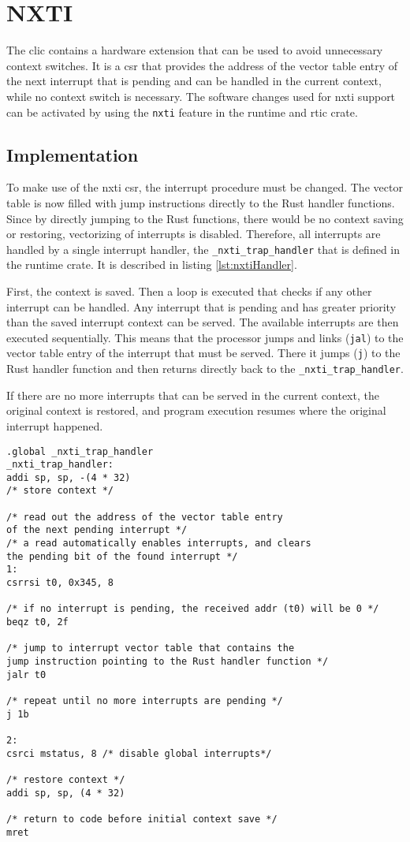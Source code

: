 \section{NXTI}
\label{sec:nxti}
The \gls{clic} contains a hardware extension that can be used to avoid unnecessary context switches. It is a \gls{csr} that provides the address of the vector table entry of the next interrupt that is pending and can be handled in the current context, while no context switch is necessary. The software changes used for nxti support can be activated by using the \texttt{nxti} feature in the runtime and \gls{rtic} crate.

\subsection{Implementation}
To make use of the nxti \gls{csr}, the interrupt procedure must be changed. The vector table is now filled with jump instructions directly to the Rust handler functions. Since by directly jumping to the Rust functions, there would be no context saving or restoring, vectorizing of interrupts is disabled. Therefore, all interrupts are handled by a single interrupt handler, the \texttt{_nxti_trap_handler} that is defined in the runtime crate. It is described in listing \ref{lst:nxtiHandler}.

First, the context is saved. Then a loop is executed that checks if any other interrupt can be handled. Any interrupt that is pending and has greater priority than the saved interrupt context can be served. The available interrupts are then executed sequentially. This means that the processor jumps and links (\texttt{jal}) to the vector table entry of the interrupt that must be served. There it jumps (\texttt{j}) to the Rust handler function and then returns directly back to the \texttt{_nxti_trap_handler}.

If there are no more interrupts that can be served in the current context, the original context is restored, and program execution resumes where the original interrupt happened.

\begin{lstlisting}[language={[RISC-V]Assembler}, caption={Nxti Trap Handler}, label={lst:nxtiHandler}]
.global _nxti_trap_handler
_nxti_trap_handler:
addi sp, sp, -(4 * 32)
/* store context */

/* read out the address of the vector table entry
of the next pending interrupt */
/* a read automatically enables interrupts, and clears
the pending bit of the found interrupt */
1:
csrrsi t0, 0x345, 8

/* if no interrupt is pending, the received addr (t0) will be 0 */
beqz t0, 2f

/* jump to interrupt vector table that contains the
jump instruction pointing to the Rust handler function */
jalr t0

/* repeat until no more interrupts are pending */
j 1b

2:
csrci mstatus, 8 /* disable global interrupts*/

/* restore context */
addi sp, sp, (4 * 32)

/* return to code before initial context save */
mret
\end{lstlisting}

